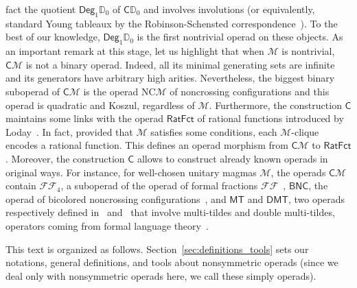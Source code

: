 \documentclass[10pt,reqno]{amsart}
\numberwithin{equation}{subsection}
\newcommand{\Mca}{\mathcal{M}}
\newcommand{\Dbb}{\mathbb{D}}
\newcommand{\BNC}{\mathsf{BNC}}
\newcommand{\Cli}{\mathsf{C}}
\newcommand{\RatFct}{\mathsf{RatFct}}
\newcommand{\MT}{\mathsf{MT}}
\newcommand{\DMT}{\mathsf{DMT}}
\newcommand{\Deg}{\mathsf{Deg}}
\newcommand{\NC}{\mathrm{NC}}
\newcommand{\FF}{\mathcal{F}\mathcal{F}}
\begin{document}
fact the quotient $\Deg_1\Dbb_0$ of $\Cli\Dbb_0$ and involves
involutions (or equivalently, standard Young tableaux by the
Robinson-Schensted correspondence~\cite{Lot02}). To the best of our
knowledge, $\Deg_1\Dbb_0$ is the first nontrivial operad on these
objects. As an important remark at this stage, let us highlight that
when $\Mca$ is nontrivial, $\Cli\Mca$ is not a binary operad. Indeed,
all its minimal generating sets are infinite and its generators have
arbitrary high arities. Nevertheless, the biggest binary suboperad of
$\Cli\Mca$ is the operad $\NC\Mca$ of noncrossing configurations and
this operad is quadratic and Koszul, regardless of $\Mca$. Furthermore,
the construction $\Cli$ maintains some links with the operad $\RatFct$
of rational functions introduced by Loday~\cite{Lod10}. In fact,
provided that $\Mca$ satisfies some conditions, each $\Mca$-clique
encodes a rational function. This defines an operad morphism from
$\Cli\Mca$ to $\RatFct$. Moreover, the construction $\Cli$ allows to
construct already known operads in original ways. For instance, for
well-chosen unitary magmas $\Mca$, the operads $\Cli\Mca$ contain
$\FF_4$, a suboperad of the operad of formal fractions
$\FF$~\cite{CHN16}, $\BNC$, the operad of bicolored noncrossing
configurations~\cite{CG14}, and $\MT$ and $\DMT$, two operads respectively
defined in~\cite{LMN13} and~\cite{GLMN16} that involve multi-tildes and
double multi-tildes, operators coming from formal language
theory~\cite{CCM11}.
\smallskip

This text is organized as follows. Section~\ref{sec:definitions_tools}
sets our notations, general definitions, and tools about nonsymmetric
operads (since we deal only with nonsymmetric operads here, we call
these simply operads).
\smallskip
\end{document}
